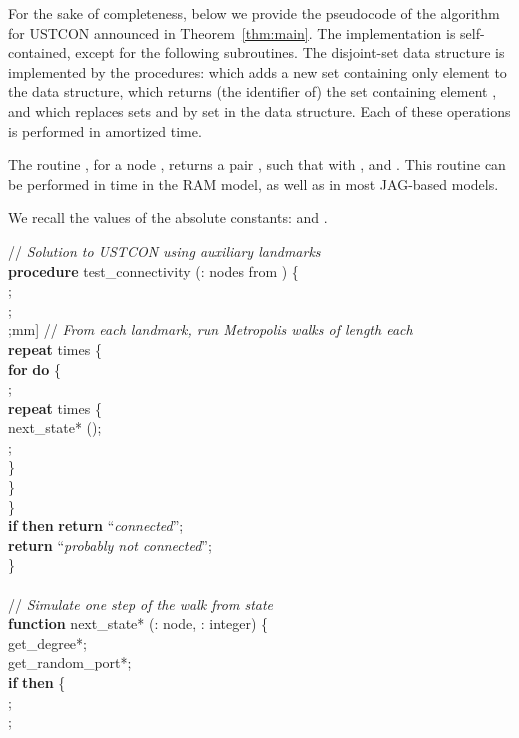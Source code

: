 \documentclass[11pt,a4paper]{article}
\renewcommand{\*}{\hspace*{5mm}}
\begin{document}
For the sake of completeness, below we provide the pseudocode of the algorithm for USTCON announced in Theorem~\ref{thm:main}. The implementation is self-contained, except for the following subroutines. The disjoint-set data structure is implemented by the procedures:  which adds a new set containing only element  to the data structure,  which returns (the identifier of) the set containing element , and  which replaces sets  and  by set  in the data structure. Each of these operations is performed in amortized  time.

The routine , for a node , returns a pair , such that  with , and . This routine can be performed in  time in the RAM model, as well as in most JAG-based models.

We recall the values of the absolute constants:  and .

\medskip
\noindent
// \emph{Solution to USTCON using  auxiliary landmarks}\\
\textbf{procedure} test\_connectivity (: nodes from ) \{\\
\* ;\\
\* ;\\
\* ;\2mm]
\* // \emph{From each landmark, run  Metropolis walks  of length  each}\\
\* \textbf{repeat}  times \{\\
\* \* \textbf{for}  \textbf{do} \{\\
\* \* \* ; \\
\* \* \* \textbf{repeat}  times \{\\
\* \* \* \*  next\_state* ();\\
\* \* \* \* ;\\
\* \* \* \}\\
\* \* \}\\
\* \}\\
\* \textbf{if}  \textbf{then} \textbf{return} ``\emph{connected}'';\\
\* \textbf{return} ``\emph{probably not connected}'';\\
\}\\
\\
// \emph{Simulate one step of the walk  from state }\\
\textbf{function} next\_state* (: node, : integer) \{\\
\* get\_degree*;\\
\*  get\_random\_port*;\\
\* \textbf{if}  \textbf{then} \{\\
\* \* ;\\
\* \* ;\\
\end{document}
